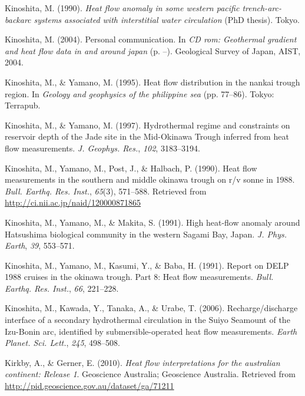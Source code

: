 \documentclass[draft,linenumbers]{agujournal2018}
\begin{document}
\leavevmode{}%
Kinoshita, M. (1990). \emph{Heat flow anomaly in some western pacific
trench-arc-backarc systems associated with interstitial water
circulation} (PhD thesis). Tokyo.

\leavevmode{}%
Kinoshita, M. (2004). Personal communication. In \emph{CD rom:
Geothermal gradient and heat flow data in and around japan} (p. --).
Geological Survey of Japan, AIST, 2004.

\leavevmode{}%
Kinoshita, M., \& Yamano, M. (1995). Heat flow distribution in the
nankai trough region. In \emph{Geology and geophysics of the philippine
sea} (pp. 77--86). Tokyo: Terrapub.

\leavevmode{}%
Kinoshita, M., \& Yamano, M. (1997). Hydrothermal regime and constraints
on reservoir depth of the {Jade} site in the {Mid-Okinawa Trough}
inferred from heat flow measurements. \emph{J. Geophys. Res.},
\emph{102}, 3183--3194.

\leavevmode{}%
Kinoshita, M., Yamano, M., Post, J., \& Halbach, P. (1990). Heat flow
measurements in the southern and middle okinawa trough on r/v sonne in
1988. \emph{Bull. Earthq. Res. Inst.}, \emph{65}(3), 571--588. Retrieved
from \url{http://ci.nii.ac.jp/naid/120000871865}

\leavevmode{}%
Kinoshita, M., Yamano, M., \& Makita, S. (1991). High heat-flow anomaly
around {Hatsushima} biological community in the western {Sagami Bay,
Japan}. \emph{J. Phys. Earth}, \emph{39}, 553--571.

\leavevmode{}%
Kinoshita, M., Yamano, M., Kasumi, Y., \& Baba, H. (1991). Report on
DELP 1988 cruises in the okinawa trough. Part 8: Heat flow measurements.
\emph{Bull. Earthq. Res. Inst.}, \emph{66}, 221--228.

\leavevmode{}%
Kinoshita, M., Kawada, Y., Tanaka, A., \& Urabe, T. (2006).
Recharge/discharge interface of a secondary hydrothermal circulation in
the {Suiyo Seamount} of the {Izu-Bonin} arc, identified by
submersible-operated heat flow measurements. \emph{Earth Planet. Sci.
Lett.}, \emph{245}, 498--508.

\leavevmode{}%
Kirkby, A., \& Gerner, E. (2010). \emph{Heat flow interpretations for
the australian continent: Release 1}. Geoscience Australia; Geoscience
Australia. Retrieved from
\url{http://pid.geoscience.gov.au/dataset/ga/71211}
\end{document}
